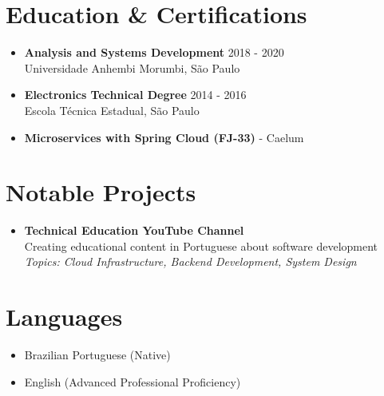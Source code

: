 \documentclass[a4paper,10pt]{article}
\begin{document}
\section*{Education \& Certifications}
\begin{itemize}
    \item \textbf{Analysis and Systems Development} \hfill 2018 - 2020\\
    Universidade Anhembi Morumbi, São Paulo
    \item \textbf{Electronics Technical Degree} \hfill 2014 - 2016\\
    Escola Técnica Estadual, São Paulo
    \item \textbf{Microservices with Spring Cloud (FJ-33)} - Caelum
\end{itemize}

\section*{Notable Projects}
\begin{itemize}
    \item \textbf{Technical Education YouTube Channel}\\
    Creating educational content in Portuguese about software development\\
    \textit{Topics: Cloud Infrastructure, Backend Development, System Design}
\end{itemize}

\section*{Languages}
\begin{itemize}
    \item Brazilian Portuguese (Native)
    \item English (Advanced Professional Proficiency)
\end{itemize}
\end{document}
